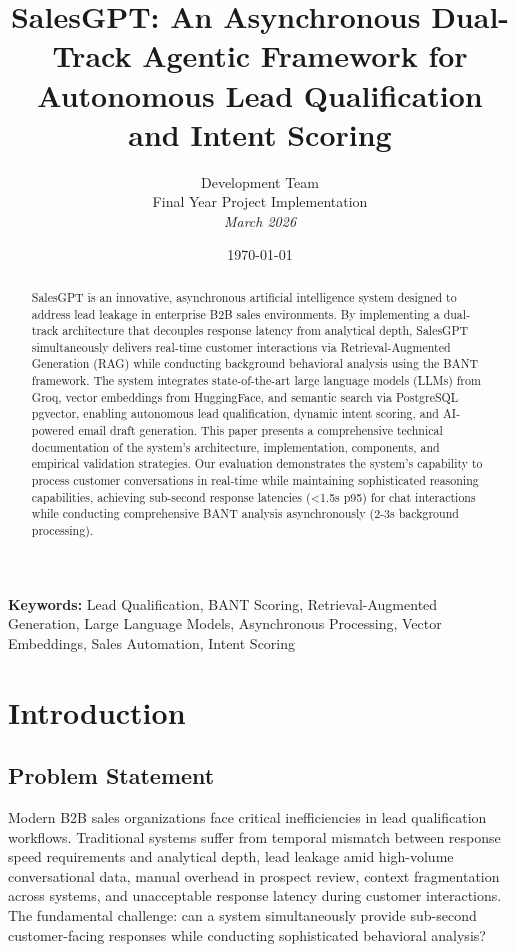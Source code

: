\documentclass[10pt,twocolumn,a4paper]{article}
\title{\textbf{SalesGPT: An Asynchronous Dual-Track Agentic Framework for Autonomous Lead Qualification and Intent Scoring}}
\author{
    Development Team\\
    Final Year Project Implementation\\
    \textit{March 2026}
}
\date{\today}
\begin{document}
\maketitle


\begin{abstract}
SalesGPT is an innovative, asynchronous artificial intelligence system designed to address lead leakage in enterprise B2B sales environments. By implementing a dual-track architecture that decouples response latency from analytical depth, SalesGPT simultaneously delivers real-time customer interactions via Retrieval-Augmented Generation (RAG) while conducting background behavioral analysis using the BANT framework. The system integrates state-of-the-art large language models (LLMs) from Groq, vector embeddings from HuggingFace, and semantic search via PostgreSQL pgvector, enabling autonomous lead qualification, dynamic intent scoring, and AI-powered email draft generation. This paper presents a comprehensive technical documentation of the system's architecture, implementation, components, and empirical validation strategies. Our evaluation demonstrates the system's capability to process customer conversations in real-time while maintaining sophisticated reasoning capabilities, achieving sub-second response latencies (<1.5s p95) for chat interactions while conducting comprehensive BANT analysis asynchronously (2-3s background processing).
\end{abstract}

\noindent\textbf{Keywords:} Lead Qualification, BANT Scoring, Retrieval-Augmented Generation, Large Language Models, Asynchronous Processing, Vector Embeddings, Sales Automation, Intent Scoring


\section{Introduction}

\subsection{Problem Statement}

Modern B2B sales organizations face critical inefficiencies in lead qualification workflows. Traditional systems suffer from temporal mismatch between response speed requirements and analytical depth, lead leakage amid high-volume conversational data, manual overhead in prospect review, context fragmentation across systems, and unacceptable response latency during customer interactions. The fundamental challenge: can a system simultaneously provide sub-second customer-facing responses while conducting sophisticated behavioral analysis?
\end{document}
